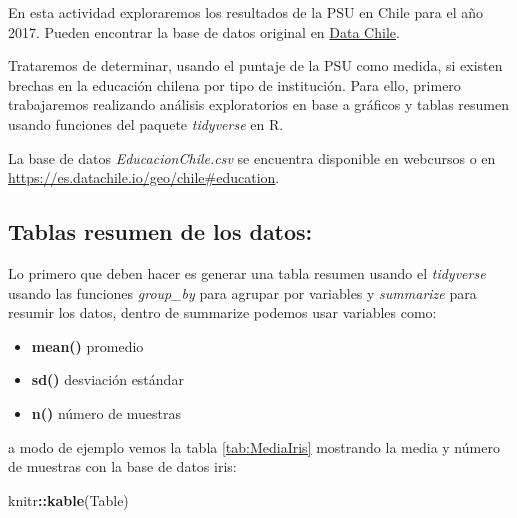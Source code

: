 \documentclass[]{book}
\newenvironment{Shaded}{\begin{snugshade}}{\end{snugshade}}
\newcommand{\DataTypeTok}[1]{\textcolor[rgb]{0.13,0.29,0.53}{#1}}
\newcommand{\KeywordTok}[1]{\textcolor[rgb]{0.13,0.29,0.53}{\textbf{#1}}}
\newcommand{\NormalTok}[1]{#1}
\newcommand{\OperatorTok}[1]{\textcolor[rgb]{0.81,0.36,0.00}{\textbf{#1}}}
\newcommand{\StringTok}[1]{\textcolor[rgb]{0.31,0.60,0.02}{#1}}
\providecommand{\tightlist}{%
  \setlength{\itemsep}{0pt}\setlength{\parskip}{0pt}}
\begin{document}
En esta actividad exploraremos los resultados de la PSU en Chile para el año 2017. Pueden encontrar la base de datos original en \href{https://es.datachile.io/geo/chile\#education}{Data Chile}.

Trataremos de determinar, usando el puntaje de la PSU como medida, si existen brechas en la educación chilena por tipo de institución. Para ello, primero trabajaremos realizando análisis exploratorios en base a gráficos y tablas resumen usando funciones del paquete \emph{tidyverse} \citep{WickhamTidy2017} en R.

La base de datos \emph{EducacionChile.csv} se encuentra disponible en webcursos o en \url{https://es.datachile.io/geo/chile\#education}.

\hypertarget{tablas-resumen-de-los-datos}{%
\subsection{Tablas resumen de los datos:}\label{tablas-resumen-de-los-datos}}

Lo primero que deben hacer es generar una tabla resumen usando el \emph{tidyverse} usando las funciones \emph{group\_by} para agrupar por variables y \emph{summarize} para resumir los datos, dentro de summarize podemos usar variables como:

\begin{itemize}
\tightlist
\item
  \textbf{mean()} promedio
\item
  \textbf{sd()} desviación estándar
\item
  \textbf{n()} número de muestras
\end{itemize}

a modo de ejemplo vemos la tabla \ref{tab:MediaIris} mostrando la media y número de muestras con la base de datos iris:

\begin{Shaded}
\end{Shaded}

\begin{Shaded}
\begin{Highlighting}[]
\NormalTok{knitr}\OperatorTok{::}\KeywordTok{kable}\NormalTok{(Table)}
\end{Highlighting}
\end{Shaded}
\end{document}

